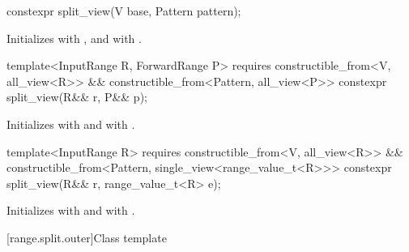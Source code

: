 %
\begin{itemdecl}
constexpr split_view(V base, Pattern pattern);
\end{itemdecl}

\begin{itemdescr}
\pnum
\effects Initializes  with , and
 with .
\end{itemdescr}

%
\begin{itemdecl}
template<InputRange R, ForwardRange P>
  requires constructible_from<V, all_view<R>> &&
           constructible_from<Pattern, all_view<P>>
constexpr split_view(R&& r, P&& p);
\end{itemdecl}

\begin{itemdescr}
\pnum
\effects
Initializes  with  and
 with .
\end{itemdescr}

%
\begin{itemdecl}
template<InputRange R>
  requires constructible_from<V, all_view<R>> &&
           constructible_from<Pattern, single_view<range_value_t<R>>>
constexpr split_view(R&& r, range_value_t<R> e);
\end{itemdecl}

\begin{itemdescr}
\pnum
\effects
Initializes  with  and
 with .
\end{itemdescr}

[range.split.outer]{Class template }

